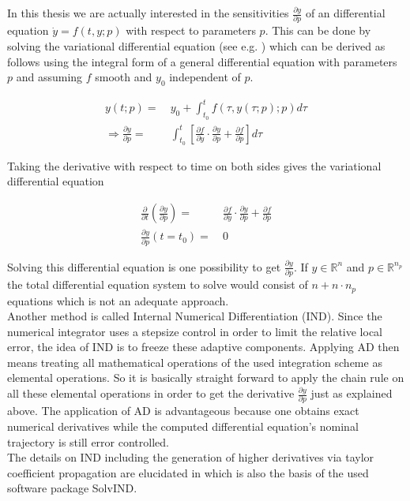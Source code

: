 \documentclass{scrartcl}[12pt, halfparskip]
\numberwithin{equation}{section}
\numberwithin{figure}{section}
\numberwithin{table}{section}
\begin{document}
In this thesis we are actually interested in the sensitivities $\frac{\partial y}{\partial p}$ of an differential equation $\dot{y}=f(t,y;p)$ with respect to parameters $p$. This can be done by solving the variational differential equation (see e.g. \cite{diff_equations_numerics}) which can be derived as follows using the integral form of a general differential equation with parameters $p$ and assuming $f$ smooth and $y_0$ independent of $p$.

\begin{align}
	y(t;p) = \ & y_0 + \int_{t_0}^{t} f(\tau,y(\tau;p);p) d\tau \\
	\Rightarrow \frac{\partial y}{\partial p} = & \int_{t_0}^{t} \left[ \frac{\partial f}{\partial y} \cdot \frac{\partial y}{\partial p} + \frac{\partial f}{\partial p} \right] d\tau \nonumber
\end{align}

Taking the derivative with respect to time on both sides gives the variational differential equation

\begin{align}
	\frac{\partial}{\partial t} \left( \frac{\partial y}{\partial p} \right) = \ & \frac{\partial f}{\partial y} \cdot \frac{\partial y}{\partial p} + \frac{\partial f}{\partial p} \\
	\frac{\partial y}{\partial p}(t=t_0) = \ & 0 \nonumber
\end{align}

Solving this differential equation is one possibility to get $\frac{\partial y}{\partial p}$. If $y \in \mathbb{R}^n$ and $p \in \mathbb{R}^{n_p}$ the total differential equation system to solve would consist of $n + n \cdot n_p$ equations which is not an adequate approach. \\
Another method is called Internal Numerical Differentiation (IND). Since the numerical integrator uses a stepsize control in order to limit the relative local error, the idea of IND is to freeze these adaptive components. 
Applying AD then means treating all mathematical operations of the used integration scheme as elemental operations. So it is basically straight forward to apply the chain rule on all these elemental operations in order to get the derivative $\frac{\partial y}{\partial p}$ just as explained above. 
The application of AD is advantageous because one obtains exact numerical derivatives while the computed differential equation's nominal trajectory is still error controlled. \\
The details on IND including the generation of higher derivatives via taylor coefficient propagation are elucidated in \cite{diss_jan} which is also the basis of the used software package SolvIND.
\end{document}
